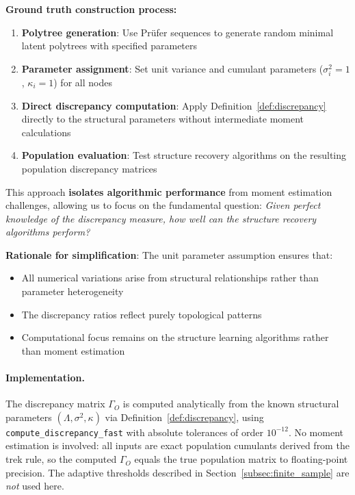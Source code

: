 \documentclass[11pt,a4paper]{article}
\numberwithin{equation}{section}
\begin{document}
\textbf{Ground truth construction process:}
\begin{enumerate}[label=(\arabic*)]
\item \textbf{Polytree generation}: Use Prüfer sequences to generate random minimal latent polytrees with specified parameters
\item \textbf{Parameter assignment}: Set unit variance and cumulant parameters ($\sigma_i^2 = 1$, $\kappa_i = 1$) for all nodes
\item \textbf{Direct discrepancy computation}: Apply Definition~\ref{def:discrepancy} directly to the structural parameters without intermediate moment calculations
\item \textbf{Population evaluation}: Test structure recovery algorithms on the resulting population discrepancy matrices
\end{enumerate}

This approach \textbf{isolates algorithmic performance} from moment estimation challenges, allowing us to focus on the fundamental question: \emph{Given perfect knowledge of the discrepancy measure, how well can the structure recovery algorithms perform?}

\textbf{Rationale for simplification}: The unit parameter assumption ensures that:
\begin{itemize}
\item All numerical variations arise from structural relationships rather than parameter heterogeneity
\item The discrepancy ratios reflect purely topological patterns  
\item Computational focus remains on the structure learning algorithms rather than moment estimation
\end{itemize}

\paragraph{Implementation.}
The discrepancy matrix $\Gamma_O$ is computed analytically from the known
structural parameters $(\Lambda,\sigma^2,\kappa)$ via
Definition~\ref{def:discrepancy}, using \texttt{compute\_discrepancy\_fast}
with absolute tolerances of order $10^{-12}$.  No moment estimation is
involved: all inputs are exact population cumulants derived from the trek
rule, so the computed $\Gamma_O$ equals the true population matrix to
floating-point precision.  The adaptive thresholds described in
Section~\ref{subsec:finite_sample} are \emph{not} used here.
\end{document}
